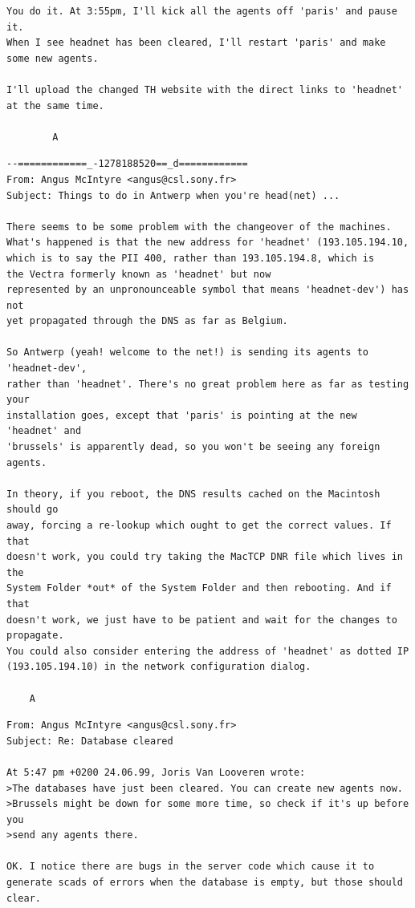 {\begin{verbatim}
You do it. At 3:55pm, I'll kick all the agents off 'paris' and pause it. 
When I see headnet has been cleared, I'll restart 'paris' and make 
some new agents.

I'll upload the changed TH website with the direct links to 'headnet' 
at the same time.

		A
\end{verbatim}
\begin{verbatim}
--============_-1278188520==_d============
From: Angus McIntyre <angus@csl.sony.fr>
Subject: Things to do in Antwerp when you're head(net) ...

There seems to be some problem with the changeover of the machines. 
What's happened is that the new address for 'headnet' (193.105.194.10, 
which is to say the PII 400, rather than 193.105.194.8, which is 
the Vectra formerly known as 'headnet' but now 
represented by an unpronounceable symbol that means 'headnet-dev') has not 
yet propagated through the DNS as far as Belgium.

So Antwerp (yeah! welcome to the net!) is sending its agents to 'headnet-dev', 
rather than 'headnet'. There's no great problem here as far as testing your 
installation goes, except that 'paris' is pointing at the new 'headnet' and 
'brussels' is apparently dead, so you won't be seeing any foreign agents.

In theory, if you reboot, the DNS results cached on the Macintosh should go 
away, forcing a re-lookup which ought to get the correct values. If that 
doesn't work, you could try taking the MacTCP DNR file which lives in the 
System Folder *out* of the System Folder and then rebooting. And if that 
doesn't work, we just have to be patient and wait for the changes to propagate. 
You could also consider entering the address of 'headnet' as dotted IP 
(193.105.194.10) in the network configuration dialog.

	A
\end{verbatim}
\begin{verbatim}
From: Angus McIntyre <angus@csl.sony.fr>
Subject: Re: Database cleared

At 5:47 pm +0200 24.06.99, Joris Van Looveren wrote:
>The databases have just been cleared. You can create new agents now.
>Brussels might be down for some more time, so check if it's up before you
>send any agents there.

OK. I notice there are bugs in the server code which cause it to 
generate scads of errors when the database is empty, but those should clear.


\end{verbatim}}
